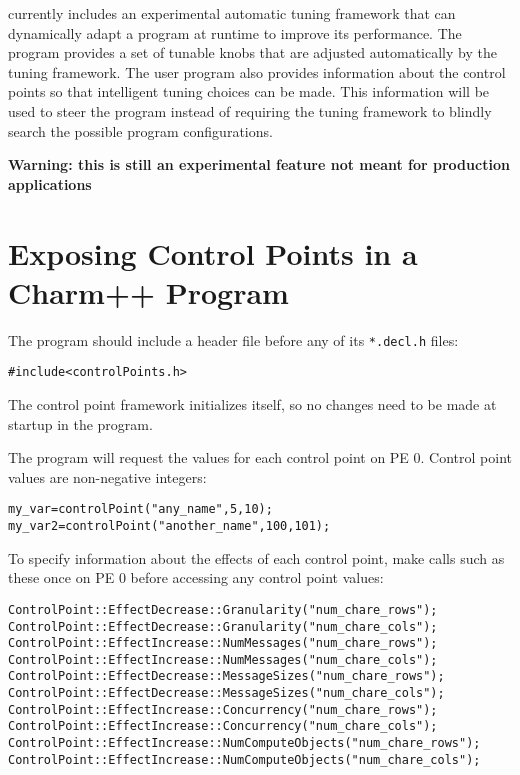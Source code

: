 \experimental{}
\charmpp{} currently includes an experimental automatic tuning
framework that can dynamically adapt a program at runtime to improve
its performance. The program provides a set of tunable knobs that are
adjusted automatically by the tuning framework. The user program also
provides information about the control points so that intelligent
tuning choices can be made. This information will be used to steer the
program instead of requiring the tuning framework to blindly search
the possible program configurations.

\textbf{Warning: this is still an experimental feature not meant for production applications}

\section{Exposing Control Points in a Charm++ Program}
The program should include a header file before any of its \texttt{*.decl.h} files:

\begin{alltt} 
    #include <controlPoints.h> 
\end{alltt} 

The control point framework initializes itself, so no changes need to be made at startup in the program.

The program will request the values for each control point on PE 0. Control
point values are non-negative integers:

\begin{alltt} 
    my_var = controlPoint("any_name", 5, 10);
    my_var2 = controlPoint("another_name", 100,101);
\end{alltt} 

To specify information about the effects of each control point, make calls such as these once on PE 0 before accessing any control point values:

\begin{alltt} 
    ControlPoint::EffectDecrease::Granularity("num_chare_rows");
    ControlPoint::EffectDecrease::Granularity("num_chare_cols");
    ControlPoint::EffectIncrease::NumMessages("num_chare_rows");
    ControlPoint::EffectIncrease::NumMessages("num_chare_cols");
    ControlPoint::EffectDecrease::MessageSizes("num_chare_rows");
    ControlPoint::EffectDecrease::MessageSizes("num_chare_cols");
    ControlPoint::EffectIncrease::Concurrency("num_chare_rows");
    ControlPoint::EffectIncrease::Concurrency("num_chare_cols");
    ControlPoint::EffectIncrease::NumComputeObjects("num_chare_rows");
    ControlPoint::EffectIncrease::NumComputeObjects("num_chare_cols");
\end{alltt} 

